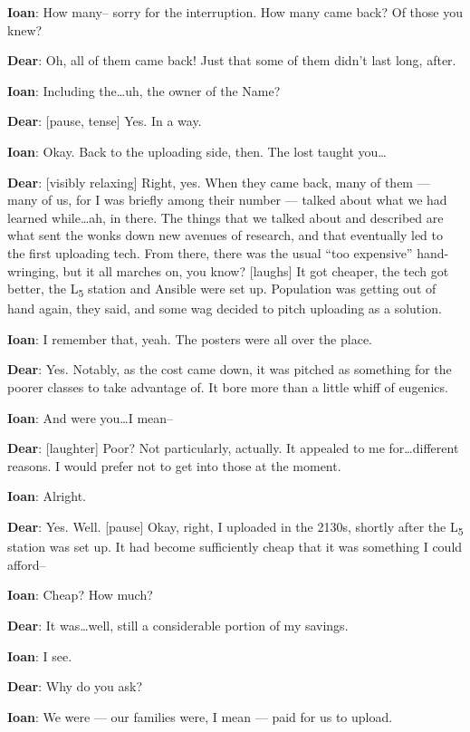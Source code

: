\textbf{Ioan}: How many-- sorry for the interruption. How many came back? Of those you knew?

\textbf{Dear}: Oh, all of them came back! Just that some of them didn't last long, after.

\textbf{Ioan}: Including the\ldots{}uh, the owner of the Name?

\textbf{Dear}: {[}pause, tense{]} Yes. In a way.

\textbf{Ioan}: Okay. Back to the uploading side, then. The lost taught you\ldots{}

\textbf{Dear}: {[}visibly relaxing{]} Right, yes. When they came back, many of them — many of us, for I was briefly among their number — talked about what we had learned while\ldots{}ah, in there. The things that we talked about and described are what sent the wonks down new avenues of research, and that eventually led to the first uploading tech. From there, there was the usual ``too expensive'' hand-wringing, but it all marches on, you know? {[}laughs{]} It got cheaper, the tech got better, the L\textsubscript{5} station and Ansible were set up. Population was getting out of hand again, they said, and some wag decided to pitch uploading as a solution.

\textbf{Ioan}: I remember that, yeah. The posters were all over the place.

\textbf{Dear}: Yes. Notably, as the cost came down, it was pitched as something for the poorer classes to take advantage of. It bore more than a little whiff of eugenics.

\textbf{Ioan}: And were you\ldots{}I mean--

\textbf{Dear}: {[}laughter{]} Poor? Not particularly, actually. It appealed to me for\ldots{}different reasons. I would prefer not to get into those at the moment.

\textbf{Ioan}: Alright.

\textbf{Dear}: Yes. Well. {[}pause{]} Okay, right, I uploaded in the 2130s, shortly after the L\textsubscript{5} station was set up. It had become sufficiently cheap that it was something I could afford--

\textbf{Ioan}: Cheap? How much?

\textbf{Dear}: It was\ldots{}well, still a considerable portion of my savings.

\textbf{Ioan}: I see.

\textbf{Dear}: Why do you ask?

\textbf{Ioan}: We were — our families were, I mean — paid for us to upload.

